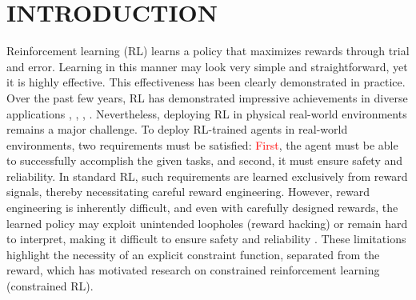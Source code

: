 \section{INTRODUCTION}

Reinforcement learning (RL) learns a policy that maximizes rewards through trial and error.
Learning in this manner may look very simple and straightforward, yet it is highly effective.
This effectiveness has been clearly demonstrated in practice.
Over the past few years, RL has demonstrated impressive achievements in diverse applications \cite{silver2017mastering}, \cite{andrychowicz2020learning}, \cite{schrittwieser2020mastering}, \cite{ouyang2022training}.
Nevertheless, deploying RL in physical real-world environments remains a major challenge.
To deploy RL-trained agents in real-world environments, two requirements must be satisfied:
\textcolor{red}{First}, the agent must be able to successfully accomplish the given tasks, and second, it must ensure safety and reliability.
In standard RL, such requirements are learned exclusively from reward signals, thereby necessitating careful reward engineering.
However, reward engineering is inherently difficult, and even with carefully designed rewards, the learned policy may exploit unintended loopholes (reward hacking) or remain hard to interpret, making it difficult to ensure safety and reliability \cite{amodei2016concrete}.
These limitations highlight the necessity of an explicit constraint function, separated from the reward, which has motivated research on constrained reinforcement learning (constrained RL).

